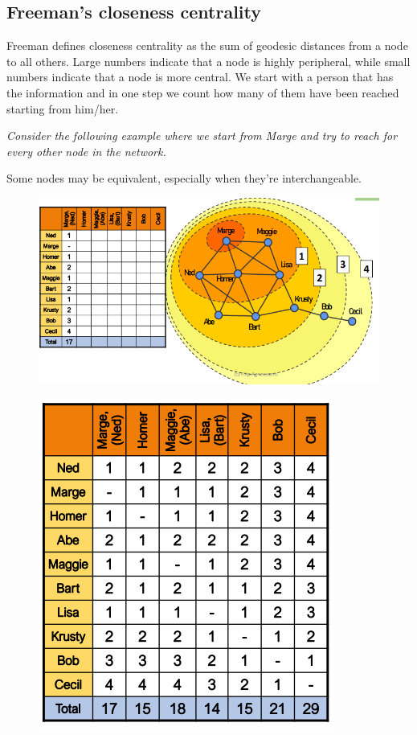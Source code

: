 \documentclass[
  notitlepage,
  onecolumn,
  openany]{book}
\begin{document}
\hypertarget{freemans-closeness-centrality}{%
\subsection{Freeman's closeness centrality}\label{freemans-closeness-centrality}}

Freeman defines closeness centrality as the sum of geodesic distances from a node to all others. Large numbers indicate that a node is highly peripheral, while small numbers indicate that a node is more central. We start with a person that has the information and in one step we count how many of them have been reached starting from him/her.

\emph{Consider the following example where we start from Marge and try to reach for every other node in the network.}

Some nodes may be equivalent, especially when they're interchangeable.

\begin{figure}[h!]

{\centering \includegraphics[width=0.5\linewidth]{images/04-Centrality/Untitled} 

}

\end{figure}
\begin{figure}[h!]

{\centering \includegraphics[width=0.5\linewidth]{images/04-Centrality/Untitled 1} 

}

\end{figure}
\end{document}

